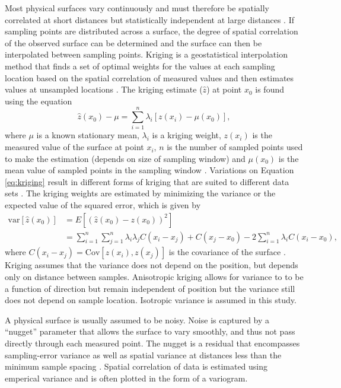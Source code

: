 \documentclass{sfuthesis}
\begin{document}
{Most physical surfaces vary continuously and must therefore be spatially correlated at short distances but statistically independent at large distances \citep{Davis1986}. If sampling points are distributed across a surface, the degree of spatial correlation of the observed surface can be determined and the surface can then be interpolated between sampling points. Kriging is a geostatistical interpolation method that finds a set of optimal weights for the values at each sampling location based on the spatial correlation of measured values and then estimates values at unsampled locations \citep{Davis1986, Li2014}. The kriging estimate ($\hat{z}$) at point $x_0$ is found using the equation
\begin{equation}
\label{eq:kriging}
\hat{z}(x_0) - \mu = \sum_{i=1}^{n} \lambda_i [z(x_i)-\mu(x_0)],
\end{equation}
where $\mu$ is a known stationary mean, $\lambda_i$ is a kriging weight, $z(x_i)$ is the measured value of the surface at point $x_i$, $n$ is the number of sampled points used to make the estimation (depends on size of sampling window) and $\mu(x_0)$ is the mean value of sampled points in the sampling window \citep{Wackernagel2003, Li2008}. Variations on Equation \ref{eq:kriging} result in different forms of kriging that are suited to different data sets \cite[][and sources within]{Li2014}. The kriging weights are estimated by minimizing the variance or the expected value of the squared error, which is given by
\begin{align}
\mathrm{var}[\hat{z}(x_0)] &= E[(\hat{z}(x_0)-z(x_0))^2]\\
&=\sum_{i=1}^{n}\sum_{j=1}^{n}\lambda_i \lambda_j C(x_i-x_j)+C(x_j-x_0)-2 \sum_{i=1}^{n} \lambda_i C(x_i-x_0),
\end{align}
where $C(x_i-x_j) = \mathrm{Cov}[z(x_i),z(x_j)]$ is the covariance of the surface \citep{Li2008}. Kriging assumes that the variance does not depend on the position, but depends only on distance between samples.  Anisotropic kriging allows for variance to to be a function of direction but remain independent of position but the variance still does not depend on sample location. Isotropic variance is assumed in this study.

A physical surface is usually assumed to be noisy. Noise is captured by a ``nugget'' parameter that allows the surface to vary smoothly, and thus not pass directly through each measured point. The nugget is a residual that encompasses sampling-error variance as well as spatial variance at distances less than the minimum sample spacing \citep{Li2008}. Spatial correlation of data is estimated using emperical variance and is often plotted in the form of a variogram.  

}
\end{document}
